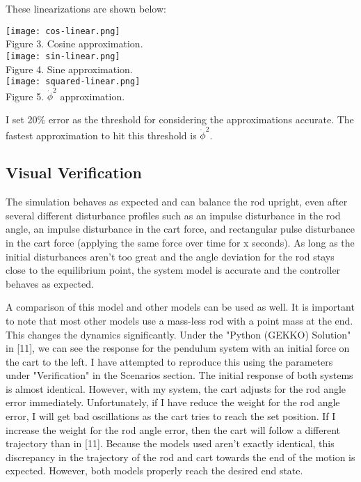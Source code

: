 \documentclass{article}
\begin{document}
\noindent These linearizations are shown below:
\vspace{5mm}

\begin{center}
    \texttt{[image: cos-linear.png]}\\
    Figure 3. Cosine approximation. \\
    \texttt{[image: sin-linear.png]} \\
    Figure 4. Sine approximation. \\
        \vspace{8mm}
    \texttt{[image: squared-linear.png]} \\
    Figure 5. $\Dot{\phi}^2$ approximation. \\
\end{center}

I set 20\% error as the threshold for considering the approximations accurate. The fastest approximation to hit this threshold is  $\Dot{\phi}^2$.

\subsection{Visual Verification}

The simulation behaves as expected and can balance the rod upright, even after several different disturbance profiles such as an impulse disturbance in the rod angle, an impulse disturbance in the cart force, and rectangular pulse disturbance in the cart force (applying the same force over time for x seconds). As long as the initial disturbances aren't too great and the angle deviation for the rod stays close to the equilibrium point, the system model is accurate and the controller behaves as expected.

A comparison of this model and other models can be used as well. It is important to note that most other models use a mass-less rod with a point mass at the end. This changes the dynamics significantly. Under the "Python (GEKKO) Solution" in [11], we can see the response for the pendulum system with an initial force on the cart to the left. I have attempted to reproduce this using the parameters under "Verification" in the Scenarios section. The initial response of both systems is almost identical. However, with my system, the cart adjusts for the rod angle error immediately. Unfortunately, if I have reduce the weight for the rod angle error, I will get bad oscillations as the cart tries to reach the set position. If I increase the weight for the rod angle error, then the cart will follow a different trajectory than in [11]. Because the models used aren't exactly identical, this discrepancy in the trajectory of the rod and cart towards the end of the motion is expected. However, both models properly reach the desired end state.
\end{document}
